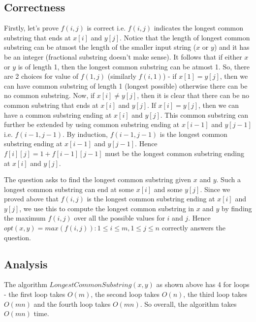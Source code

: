 \documentclass{article}
\begin{document}
    \subsection*{Correctness}
    Firstly, let's prove $f(i, j)$ is correct i.e. $f(i, j)$ indicates the longest common substring that ends at $x[i]$ and $y[j]$. Notice that the length of longest common substring can be atmost the length of the smaller input string ($x$ or $y$) and it has be an integer (fractional substring doesn't make sense). It follows that if either $x$ or $y$ is of length 1, then the longest common substring can be atmost 1. So, there are 2 choices for  value of $f(1, j)$ (similarly $f(i, 1)$) - if $x[1] = y[j]$, then we can have common substring of length 1 (longest possible) otherwise there can be no common substring. Now, if $x[i] \ne y[j]$, then it is clear that there can be no common substring that ends at $x[i]$ and $y[j]$. If $x[i] = y[j]$, then we can have a common substring ending at $x[i]$ and $y[j]$. This common substring can further be extended by using common substring ending at $x[i-1]$ and $y[j-1]$ i.e. $f(i-1, j-1)$. By induction, $f(i-1, j-1)$ is the longest common substring ending at $x[i-1]$ and $y[j-1]$. Hence $f[i][j] = 1 + f[i-1][j-1]$ must be the longest common substring ending at $x[i]$ and $y[j]$.

    The question asks to find the longest common substring given $x$ and $y$. Such a longest common substring can end at some $x[i]$ and some $y[j]$. Since we proved above that $f(i, j)$ is the longest common substring ending at $x[i]$ and $y[j]$, we use this to compute the longest common substring in $x$ and $y$ by finding the maximum $f(i, j)$ over all the possible values for $i$ and $j$. Hence $opt(x, y) = max(f(i, j)) : 1 \le i \le m, 1 \le j \le n$ correctly answers the question.

    \subsection*{Analysis}
    The algorithm $LongestCommonSubstring(x, y)$ as shown above has 4 for loops - the first loop takes $O(m)$, the second loop takes $O(n)$, the third loop takes $O(mn)$ and the fourth loop takes $O(mn)$. So overall, the algorithm takes $O(mn)$ time.
\end{document}
